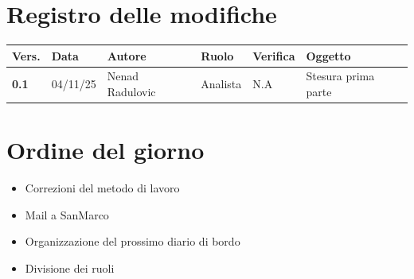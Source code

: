 \documentclass[a4paper,12pt]{article}
\begin{document}


\newpage
\section*{Registro delle modifiche}

\begin{table}[h!]
    \begin{tabularx}{\textwidth}{|l|l|l|l|X|X|}
        \hline
        \textbf{Vers.} & \textbf{Data} & \textbf{Autore} & \textbf{Ruolo} & \textbf{Verifica} & \textbf{Oggetto} \\
        \hline
        \textbf{0.1} & 04/11/25 & Nenad Radulovic & Analista & N.A & Stesura prima parte \\
        \hline
    \end{tabularx}
\end{table}

\newpage
\tableofcontents
\newpage

\section{Ordine del giorno}
\begin{itemize}
    \item Correzioni del metodo di lavoro
    \item Mail a SanMarco
    \item Organizzazione del prossimo diario di bordo
    \item Divisione dei ruoli
\end{itemize}
\end{document}
